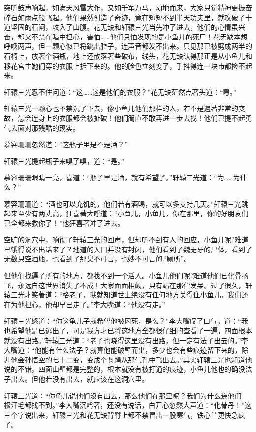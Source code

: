 \documentclass[12pt,oneside]{book}
\begin{document}
突听鼓声响起，如满天风雷大作，又如千军万马，动地而来，大家只觉精神更振奋碎石如雨点般飞起。他们果然创造了奇迹，竟在短短不到半天功夫里，就攻破了十道坚固的石闸，攻入了山腹。花无缺和轩辕三光当先冲了进去，他们的心情虽兴奋，却又不禁在暗中担心，害怕\ldots\ldots 他们只怕发现的是小鱼儿的死尸！花无缺本想呼唤两声，但一颗心似已将跳出腔子，连声音都发不出来。只见那已被劈成两半的石椅上，放著个酒瓶，地上还散落著些破布，线头，花无缺认得那正是从小鱼儿和移花宫主她们穿的衣服上拆下来的。他的脸色立刻变了，手抖得连一块市都捡不起来。

轩辕三光忍不住问道：``这\ldots\ldots 这是他们的衣服？''花无缺茫然点著头道：``嗯。''

轩辕三光一颗心也不禁沉了下去，像小鱼儿他们那样的人，若不是遇著非常的变故，怎会连身上的衣服都会被扯破！他们简直不敢再进一步去找！他们已提不起勇气去面对那残酷的现实。

慕容珊珊忽然道：``这瓶子里是不是酒？''

轩辕三光提起瓶子来嗅了嗅，道：``是。''

慕容珊珊眼睛一亮，喜道：``瓶子里是酒，就有希望了。''轩辕三光道：``为\ldots\ldots 为什么？''

慕容珊珊道：``酒也可以充饥的，他们若有酒喝，就可以多支持几天。''轩辕三光跳起来至少有两丈高，狂喜著大呼道：``小鱼儿，小鱼儿，你在那里，你的好朋友们已全都来救你了！''他狂喜著冲了进去。

空旷的洞穴中，响彻了轩辕三光的回声，但却听不到有人的回应，小鱼儿呢?难道已饿得说不出话来了？地道的入囗并没有封闭，他们看到了魏无牙的尸体，看到了无数只空酒瓶，也看到了那臭不可言，也妙不可言的.``厕所''。

但他们找遍了所有的地方，都找不到一个活人。小鱼儿他们呢?难道他们已化骨扬飞，永远自这世界消失了不成！大家面面相觑，只有站在那伫发呆。过了很久，轩辕三光才笑著道：``格老子，我就知道世上绝没有任何地方关得住小鱼儿，我们还在为他担心，他却早已走了。''李大嘴道：``他没有走。''

轩辕三光怒道：``你这龟儿子就希望他被困死，是么？''李大嘴叹了口气，道：``我也希望他是已逃出了，可是我方才已将这地方全都很仔细的查看了一遍，四面根本就没有出路。''轩辕三光道：``老子也晓得这里没有出路，但一定有法子出去的。''李大嘴道：``他能有什么法子？就算他能破壁而出，多少也会有些痕迹留下来的，除非他会孙悟空的七十二变，变成个苍蝇从那气孔中飞出去。''其实轩辕三光也知道他说的不错，四面山壁都是完整的，根本就没有被打通的痕迹，小鱼儿他也的确没法子出去。但他若没有出去，就应该在这洞穴里。

轩辕三光道：``你龟儿说他们没有出去，那么他们在那里呢？我们为什么连他们一根汗毛都找不到。''李大嘴沉吟著，还没有说话，白开心忽然大声道：``化骨丹！''这三个字说出来，轩辕三光和花无缺背脊上都不禁冒出一股寒气，铁心兰更快急疯了。
\end{document}
